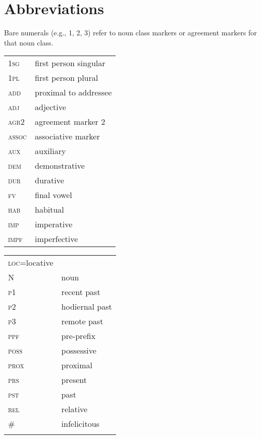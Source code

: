 \documentclass[output=paper,modfonts,nonflat]{langsci/langscibook}
\begin{document}
\section*{Abbreviations}
Bare numerals (e.g., 1, 2, 3) refer to noun class markers or agreement markers for that noun class.\\






\begin{tabularx}{.45\textwidth}{lQ}
\textsc{1sg} & first person singular\\
\textsc{1pl} & first person plural\\
\textsc{add} & proximal to addressee\\
\textsc{adj} & adjective\\
\textsc{agr2} & agreement marker 2\\
\textsc{assoc} & associative marker\\
\textsc{aux} & auxiliary\\
\textsc{dem} & demonstrative\\
\textsc{dur} & durative\\
\textsc{fv} & final vowel\\
\textsc{hab} & habitual\\
\textsc{imp} & imperative\\
\textsc{impf} & imperfective\\
\end{tabularx}
\begin{tabularx}{.45\textwidth}{lQ}
\textsc{loc}=locative\\
N & noun\\
\textsc{p1} & recent past\\
\textsc{p2} & hodiernal past\\
\textsc{p3} & remote past\\
\textsc{ppf} & pre-prefix\\
\textsc{poss} & possessive\\
\textsc{prox} & proximal\\
\textsc{prs} & present\\
\textsc{pst} & past\\
\textsc{rel} & relative\\
\# & infelicitous\\
\\
\end{tabularx}

\sloppy
\printbibliography[heading=subbibliography,notkeyword=this]
\end{document}
